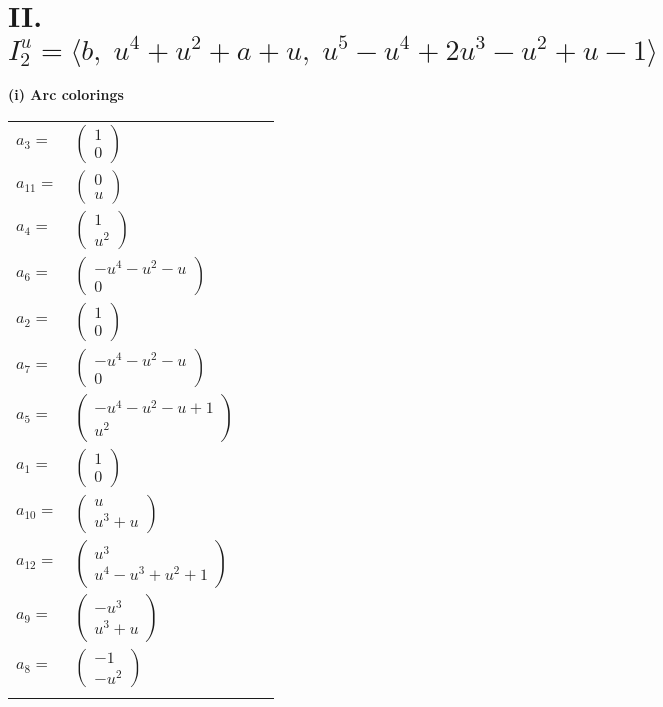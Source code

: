 \documentclass[1p]{elsarticle_modified}
\theoremstyle{definition}
\begin{document}
\centering \section*{II. $I^u_{2}= \langle b,\;u^4+u^2+a+u,\;u^5- u^4+2 u^3- u^2+u-1 \rangle$}
\flushleft \textbf{(i) Arc colorings}\\
\begin{tabular}{m{7pt} m{180pt} m{7pt} m{180pt} }
\flushright $a_{3}=$&$\begin{pmatrix}1\\0\end{pmatrix}$ \\
\flushright $a_{11}=$&$\begin{pmatrix}0\\u\end{pmatrix}$ \\
\flushright $a_{4}=$&$\begin{pmatrix}1\\u^2\end{pmatrix}$ \\
\flushright $a_{6}=$&$\begin{pmatrix}- u^4- u^2- u\\0\end{pmatrix}$ \\
\flushright $a_{2}=$&$\begin{pmatrix}1\\0\end{pmatrix}$ \\
\flushright $a_{7}=$&$\begin{pmatrix}- u^4- u^2- u\\0\end{pmatrix}$ \\
\flushright $a_{5}=$&$\begin{pmatrix}- u^4- u^2- u+1\\u^2\end{pmatrix}$ \\
\flushright $a_{1}=$&$\begin{pmatrix}1\\0\end{pmatrix}$ \\
\flushright $a_{10}=$&$\begin{pmatrix}u\\u^3+u\end{pmatrix}$ \\
\flushright $a_{12}=$&$\begin{pmatrix}u^3\\u^4- u^3+u^2+1\end{pmatrix}$ \\
\flushright $a_{9}=$&$\begin{pmatrix}- u^3\\u^3+u\end{pmatrix}$ \\
\flushright $a_{8}=$&$\begin{pmatrix}-1\\- u^2\end{pmatrix}$\\&\end{tabular}
\end{document}
